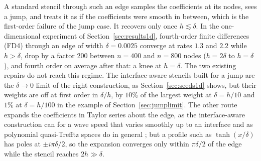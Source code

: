\documentclass[11pt]{amsart}
\theoremstyle{definition}
\theoremstyle{remark}
\begin{document}
A standard stencil through such an edge samples the coefficients at its
nodes, sees a jump, and treats it as if the coefficients were smooth in
between, which is the first-order failure of the jump case. It recovers
only once $h \lesssim \delta$. In the one-dimensional experiment of
Section~\ref{sec:results1d}, fourth-order finite differences (FD4)
through an edge of width $\delta = 0.0025$ converge at rates $1.3$ and
$2.2$ while $h > \delta$, drop by a factor $200$ between $n = 400$ and
$n = 800$ nodes ($h = 2\delta$ to $h = \delta$), and fourth order on
average after that: a knee at $h = \delta$. The two existing repairs do not
reach this regime. The interface-aware stencils built for a jump are the
$\delta \to 0$ limit of the right construction, as
Section~\ref{sec:seeds1d} shows, but their weights are off at first order
in $\delta / h$, by $10\%$ of the largest weight at $\delta = h/10$ and
$1\%$ at $\delta = h/100$ in the example of Section~\ref{sec:jumplimit}.
The other route expands the coefficients in Taylor series about the
edge, as the interface-aware construction can for a wave speed that
varies smoothly up to an interface \cite{Martin2016,MartinFornberg2017}
and as polynomial quasi-Trefftz spaces do
in general \cite{ImbertGerardMoiolaStocker2023}; but a profile such as
$\tanh(x / \delta)$ has poles at $\pm i \pi \delta / 2$, so the expansion
converges only within $\pi \delta / 2$ of the edge while the stencil
reaches $2h \gg \delta$.
\end{document}
